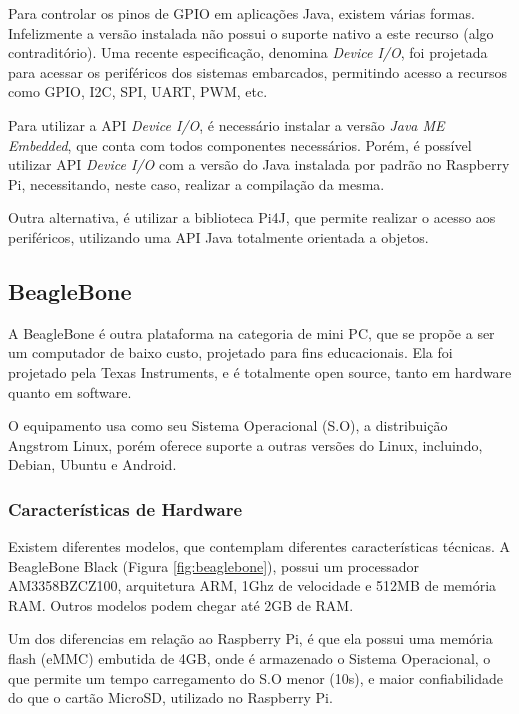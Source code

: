 Para controlar os pinos de GPIO em aplicações Java, existem várias
formas. Infelizmente a versão instalada não possui o suporte nativo
a este recurso (algo contraditório). Uma recente especificação, denomina
\emph{Device I/O}\cite{device-io:wiki}, foi projetada para acessar
os periféricos dos sistemas embarcados, permitindo acesso a recursos
como GPIO, I2C, SPI, UART, PWM, etc.

Para utilizar a API \emph{Device I/O}, é necessário instalar a versão
\emph{Java ME Embedded}\cite{device-io:wiki}, que conta com todos
componentes necessários. Porém, é possível utilizar API \emph{Device
I/O} com a versão do Java instalada por padrão no Raspberry Pi, necessitando,
neste caso, realizar a compilação da mesma.

Outra alternativa, é utilizar a biblioteca Pi4J\cite{raspberry:pi4j},
que permite realizar o acesso aos periféricos, utilizando uma API
Java totalmente orientada a objetos.


\subsection{BeagleBone}

A BeagleBone\cite{beagleboard} é outra plataforma na categoria de
mini PC, que se propõe a ser um computador de baixo custo, projetado
para fins educacionais. Ela foi projetado pela Texas Instruments,
e é totalmente open source, tanto em hardware quanto em software.

O equipamento usa como seu Sistema Operacional (S.O), a distribuição
Angstrom Linux, porém oferece suporte a outras versões do Linux, incluindo,
Debian, Ubuntu e Android.

\subsubsection{Características de Hardware}

Existem diferentes modelos, que contemplam diferentes características
técnicas. A BeagleBone Black (Figura \ref{fig:beaglebone}), possui
um processador AM3358BZCZ100, arquitetura ARM, 1Ghz de velocidade
e 512MB de memória RAM. Outros modelos podem chegar até 2GB de RAM.

Um dos diferencias em relação ao Raspberry Pi, é que ela possui uma
memória flash (eMMC) embutida de 4GB, onde é armazenado o Sistema
Operacional, o que permite um tempo carregamento do S.O menor (10s),
e maior confiabilidade do que o cartão MicroSD, utilizado no Raspberry
Pi.

